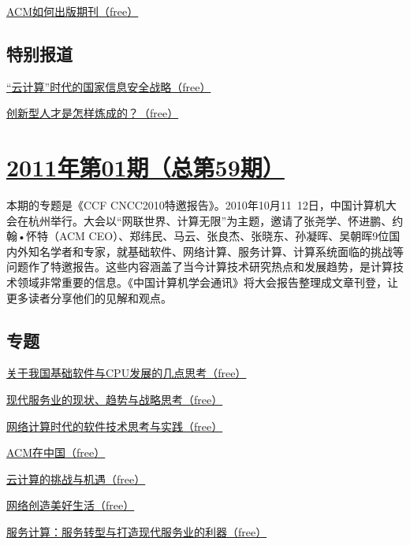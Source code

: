 \documentclass[a4paper]{article}
\begin{document}
\href{http://history.ccf.org.cn/resources/1190201776262/2011/02/16/24.pdf}{ACM如何出版期刊（free）}

\subsection{特别报道}
\href{http://history.ccf.org.cn/resources/1190201776262/2011/02/16/21.pdf}{“云计算”时代的国家信息安全战略（free）}

\href{http://history.ccf.org.cn/resources/1190201776262/2011/02/16/22.pdf}{创新型人才是怎样炼成的？（free）}


\section{\href{http://history.ccf.org.cn/sites/ccf/jsjtbbd.jsp?contentId=2590507187982}{\textbf{2011年第01期（总第59期）}}}
本期的专题是《CCF CNCC2010特邀报告》。2010年10月11~12日，中国计算机大会在杭州举行。大会以“网联世界、计算无限”为主题，邀请了张尧学、怀进鹏、约翰•怀特（ACM CEO）、郑纬民、马云、张良杰、张晓东、孙凝晖、吴朝晖9位国内外知名学者和专家，就基础软件、网络计算、服务计算、计算系统面临的挑战等问题作了特邀报告。这些内容涵盖了当今计算技术研究热点和发展趋势，是计算技术领域非常重要的信息。《中国计算机学会通讯》将大会报告整理成文章刊登，让更多读者分享他们的见解和观点。
\subsection{专题}
\href{http://history.ccf.org.cn/resources/1190201776262/2011/01/18/201101-1.pdf}{关于我国基础软件与CPU发展的几点思考（free）}

\href{http://history.ccf.org.cn/resources/1190201776262/2011/01/18/201101-9.pdf}{现代服务业的现状、趋势与战略思考（free）}

\href{http://history.ccf.org.cn/resources/1190201776262/2011/01/18/201101-2.pdf}{网络计算时代的软件技术思考与实践（free）}

\href{http://history.ccf.org.cn/resources/1190201776262/2011/01/18/201101-3.pdf}{ACM在中国（free）}

\href{http://history.ccf.org.cn/resources/1190201776262/2011/01/18/201101-4.pdf}{云计算的挑战与机遇（free）}

\href{http://history.ccf.org.cn/resources/1190201776262/2011/01/18/201101-5.pdf}{网络创造美好生活（free）}

\href{http://history.ccf.org.cn/resources/1190201776262/2011/01/18/201101-6.pdf}{服务计算：服务转型与打造现代服务业的利器（free）}
\end{document}

